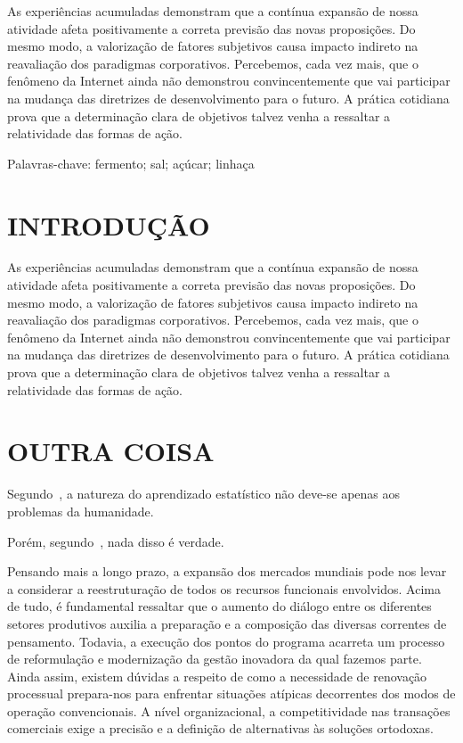 \documentclass[chapter=TITLE,section=Title,espaco=duplo,tocpage=plain,appendix=Name,floatnumber=continuous]{abnt}
\begin{document}


\UTPCapa
\UTPFalsaFolhaDeRosto
\UTPFolhaDeRosto

\begin{resumo}
As experiências acumuladas demonstram que a contínua expansão de nossa
atividade afeta positivamente a correta previsão das novas proposições. Do
mesmo modo, a valorização de fatores subjetivos causa impacto indireto na
reavaliação dos paradigmas corporativos. Percebemos, cada vez mais, que o
fenômeno da Internet ainda não demonstrou convincentemente que vai
participar na mudança das diretrizes de desenvolvimento para o futuro. A
prática cotidiana prova que a determinação clara de objetivos talvez venha
a ressaltar a relatividade das formas de ação.

Palavras-chave: fermento; sal; açúcar; linhaça
\end{resumo}

\listoffigures
\listoftables
\listadequadros
\sumario

\chapter{INTRODUÇÃO}

As experiências acumuladas demonstram que a contínua expansão de nossa
atividade afeta positivamente a correta previsão das novas proposições. Do
mesmo modo, a valorização de fatores subjetivos causa impacto indireto na
reavaliação dos paradigmas corporativos. Percebemos, cada vez mais, que o
fenômeno da Internet ainda não demonstrou convincentemente que vai
participar na mudança das diretrizes de desenvolvimento para o futuro. A
prática cotidiana prova que a determinação clara de objetivos talvez venha
a ressaltar a relatividade das formas de ação. 

\chapter{OUTRA COISA}

Segundo~\cite{joachims1998text}, a natureza do aprendizado estatístico não
deve-se apenas aos problemas da humanidade.

Porém, segundo~\cite{vapnik2000nature}, nada disso é verdade.

Pensando mais a longo prazo, a expansão dos mercados mundiais pode nos
levar a considerar a reestruturação de todos os recursos funcionais
envolvidos. Acima de tudo, é fundamental ressaltar que o aumento do diálogo
entre os diferentes setores produtivos auxilia a preparação e a composição
das diversas correntes de pensamento. Todavia, a execução dos pontos do
programa acarreta um processo de reformulação e modernização da gestão
inovadora da qual fazemos parte. Ainda assim, existem dúvidas a respeito de
como a necessidade de renovação processual prepara-nos para enfrentar
situações atípicas decorrentes dos modos de operação convencionais. A nível
organizacional, a competitividade nas transações comerciais exige a
precisão e a definição de alternativas às soluções ortodoxas.
\end{document}
